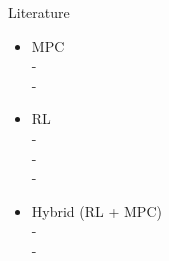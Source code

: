 \documentclass[navbaroff]{sdqbeamer}
\begin{document}
\begin{frame}[label=lit]{Literature}
    \begin{itemize}
        \item MPC\\
            - {\Fontsmaller\cite{wieber_trajectory_2006}} \\
            - {\Fontsmaller\cite{bohorquez_safe_2016}}
            \pause
        \item RL\\
            - {\Fontsmaller\cite{Chen2016DecentralizedNM}}\\
            - {\Fontsmaller\cite{chen_socially_2017}}\\
            - {\Fontsmaller\cite{everett_collision_2021}}
            \pause
        \item Hybrid (RL + MPC)\\
            - {\Fontsmaller\cite{tearle_predictive_2021}} \\
            - {\Fontsmaller\cite{xiao_learning_2023}}
    \end{itemize}

\end{frame}
\end{document}
